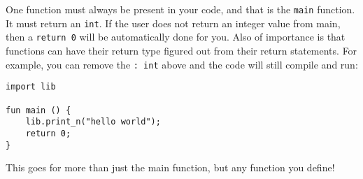 One function must always be present in your code, and that is the \lstinline|main| function. It must return an \lstinline|int|. If the user does not return an integer value from main, then a \lstinline|return 0| will be automatically done for you. Also of importance is that functions can have their return type figured out from their return statements. For example, you can remove the \lstinline|: int| above and the code will still compile and run:

\begin{lstlisting}
import lib

fun main () {
	lib.print_n("hello world");
	return 0;
}
\end{lstlisting}

This goes for more than just the main function, but any function you define!
